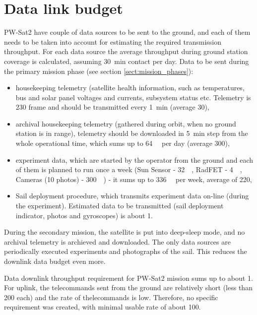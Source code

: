 \section{Data link budget}
PW-Sat2 have couple of data sources to be sent to the ground, and each of them needs to be taken into account for estimating the required transmission throughput. For each data source the average throughput during ground station coverage is calculated, assuming \SI{30}{\minute} contact per day.
Data to be sent during the primary mission phase (see section \ref{sect:mission_phases}):
\begin{itemize}
    \item housekeeping telemetry (satellite health information, such as temperatures, bus and solar panel voltages and currents, subsystem status etc. Telemetry is \SI{230}{\byte} frame and should be transmitted every \SI{1}{\minute} (average \SI{30}{\bps}),
    \item archival housekeeping telemetry (gathered during orbit, when no ground station is in range), telemetry should be downloaded in \SI{5}{\minute} step from the whole operational time, which sums up to \SI{64}{\kilo\byte} per day (average \SI{300}{\bps}),
    \item experiment data, which are started by the operator from the ground and each of them is planned to run once a week (Sun Sensor -  \SI{32}{\kilo\byte}, RadFET - \SI{4}{\kilo\byte}, Cameras (10 photos) - \SI{300}{\kilo\byte}) - it sums up to \SI{336}{\kilo\byte} per week, average of \SI{220}{\bps},
    \item Sail deployment procedure, which transmits experiment data on-line (during the experiment). Estimated data to be transmitted (sail deployment indicator, photos and gyroscopes) is about \SI{1}{\kbps}.
\end{itemize}
During the secondary mission, the satellite is put into deep-sleep mode, and no archival telemetry is archieved and downloaded. The only data sources are periodically executed experiments and photographs of the sail. This reduces the downlink data budget even more.

Data downlink throughput requirement for PW-Sat2 mission sums up to about \SI{1}{\kbps}.
For uplink, the telecommands sent from the ground are relatively short (less than \SI{200}{\byte} each) and the rate of thelecommands is low. Therefore, no specific requirement was created, with minimal usable rate of about \SI{100}{\bps}.

